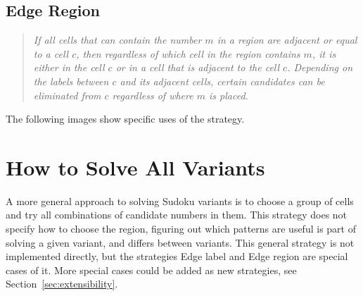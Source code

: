\subsection*{Edge Region}

\begin{quote}
    \textit{
        If all cells that can contain the number $m$ in a region are adjacent or equal to a cell $c$,
        then regardless of which cell in the region contains $m$,
        it is either in the cell $c$ or in a cell that is adjacent to the cell $c$.
        Depending on the labels between $c$ and its adjacent cells,
        certain candidates can be eliminated from $c$ regardless of where $m$ is placed.
    }
\end{quote}

The following images show specific uses of the strategy.



\section{How to Solve All Variants}

A more general approach to solving Sudoku variants is to choose a group of cells and
try all combinations of candidate numbers in them.
This strategy does not specify how to choose the region, figuring out which patterns are useful
is part of solving a given variant, and differs between variants.
This general strategy is not implemented directly,
but the strategies Edge label and Edge region are special cases of it.
More special cases could be added as new strategies, see Section~\ref{sec:extensibility}.

